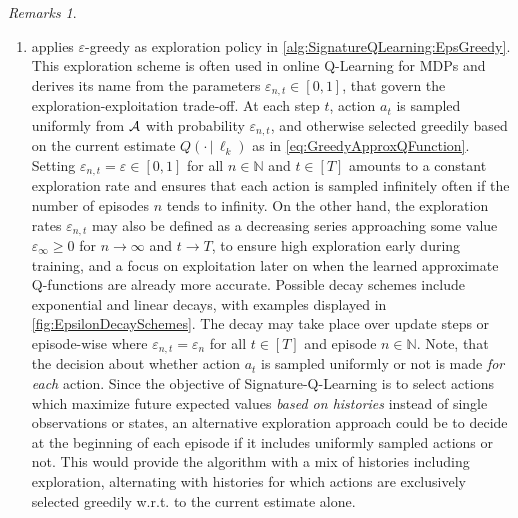 \documentclass[
    a4paper,
    11pt,
    bibliography=totoc,
    listof=totoc,      
    headinclude=true,
    cleardoublepage=empty,
]{scrbook}
\theoremstyle{plain}
\theoremstyle{definition}
\theoremstyle{remark}
\newtheorem{remarks}[theorem]{Remarks}
\newcommand{\SetN}{\mathbb N}
\newcommand{\SpaceA}{{\cal A}}
\begin{document}
\begin{remarks}
\begin{enumerate}
        \item {} applies  
        $\varepsilon$-greedy as exploration policy in
        \cref{alg:SignatureQLearning:EpsGreedy}. This exploration scheme is
        often used in online Q-Learning for MDPs and derives its name from the
        parameters $\varepsilon_{n,t} \in [0,1]$, that govern the
        exploration-exploitation trade-off. At each step $t$, action $a_t$ is
        sampled uniformly from $\SpaceA$ with probability $\varepsilon_{n,t}$,
        and otherwise selected greedily based on the current estimate $Q(\cdot\,|\,
        \ell_k)$ as in \cref{eq:GreedyApproxQFunction}. Setting 
        $\varepsilon_{n,t} =\varepsilon \in [0,1]$
        for all $n\in\SetN$ and $t\in[T]$ amounts to a constant exploration rate
        and ensures that each action is sampled infinitely often if the number
        of episodes $n$ tends to infinity. On the other hand, the exploration rates $\varepsilon_{n,t}$ may also be defined as a decreasing series approaching some value $\varepsilon_\infty \geq 0$
        for $n\to\infty$ and $t\to T$, to ensure high exploration early during training, and a focus on exploitation later on when the learned approximate Q-functions are already more accurate.
        Possible decay schemes include exponential and linear decays, with
        examples displayed in \cref{fig:EpsilonDecaySchemes}. The
        decay may take place over update steps or episode-wise where $\varepsilon_{n,t} = \varepsilon_{n}$ for all $t\in[T]$ and episode $n\in\SetN$. Note, that the decision about
        whether action $a_t$ is sampled uniformly or not is made \textit{for
        each} action. Since the objective of Signature-Q-Learning is to select
        actions which maximize future expected values \textit{based on
        histories} instead of single observations or states, an alternative
        exploration approach could be to decide at the beginning of each
        episode if it includes uniformly sampled actions or not. This would
        provide the algorithm with a mix of histories including exploration,
        alternating with histories for which actions are exclusively selected
        greedily w.r.t. to the current estimate alone.


\end{enumerate}
\end{remarks}
\end{document}
